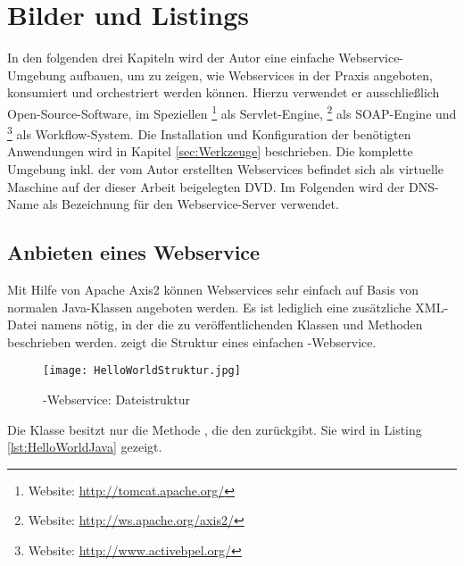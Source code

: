\chapter{Bilder und Listings}

In den folgenden drei Kapiteln wird der Autor eine einfache Webservice-Umgebung aufbauen, um zu zeigen, wie Webservices in der Praxis angeboten, konsumiert und orchestriert werden können. Hierzu verwendet er ausschließlich Open-Source-Software, im Speziellen \footnote{Website: \url{http://tomcat.apache.org/}} als Servlet-Engine, \footnote{Website: \url{http://ws.apache.org/axis2/}} als SOAP-Engine und \footnote{Website: \url{http://www.activebpel.org/}} als Workflow-System. Die Installation und Konfiguration der benötigten Anwendungen wird in Kapitel \ref{sec:Werkzeuge} beschrieben. Die komplette Umgebung inkl. der vom Autor erstellten Webservices befindet sich als virtuelle Maschine auf der dieser Arbeit beigelegten DVD. Im Folgenden wird der DNS-Name  als Bezeichnung für den Webservice-Server verwendet.

\section{Anbieten eines Webservice}
\label{sec:AnbietenEinesWebservices}
Mit Hilfe von Apache Axis2 können Webservices sehr einfach auf Basis von normalen Java-Klassen angeboten werden. Es ist lediglich eine zusätzliche XML-Datei namens  nötig, in der die zu veröffentlichenden Klassen und Methoden beschrieben werden.  zeigt die Struktur eines einfachen -Webservice.

\begin{figure}[htb]
\centering
\texttt{[image: HelloWorldStruktur.jpg]}
\caption{-Webservice: Dateistruktur}
\label{fig:HelloWorldStruktur}
\end{figure}

Die Klasse  besitzt nur die Methode , die den   zurückgibt. Sie wird in Listing \ref{lst:HelloWorldJava} gezeigt. 

\newpage
\lstset{language=Java, basicstyle=\footnotesize, showstringspaces=false, tabsize=2}


